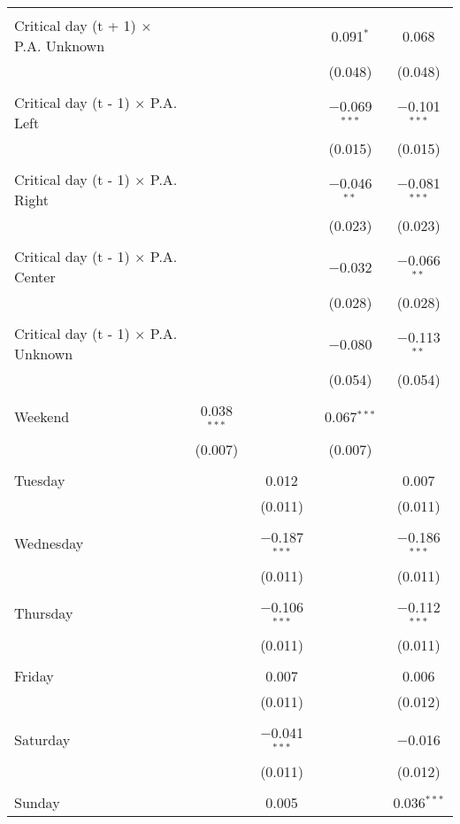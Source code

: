 \documentclass[
]{article}
\begin{document}
\begin{table}[!htbp]
{\begin{tabular}{@{\extracolsep{5pt}}lcccc}
  & & & & \\ 
 Critical day (t + 1) $\times$ P.A. Unknown &  &  & 0.091$^{*}$ & 0.068 \\ 
  &  &  & (0.048) & (0.048) \\ 
  & & & & \\ 
 Critical day (t - 1) $\times$ P.A. Left &  &  & $-$0.069$^{***}$ & $-$0.101$^{***}$ \\ 
  &  &  & (0.015) & (0.015) \\ 
  & & & & \\ 
 Critical day (t - 1) $\times$ P.A. Right &  &  & $-$0.046$^{**}$ & $-$0.081$^{***}$ \\ 
  &  &  & (0.023) & (0.023) \\ 
  & & & & \\ 
 Critical day (t - 1) $\times$ P.A. Center &  &  & $-$0.032 & $-$0.066$^{**}$ \\ 
  &  &  & (0.028) & (0.028) \\ 
  & & & & \\ 
 Critical day (t - 1) $\times$ P.A. Unknown &  &  & $-$0.080 & $-$0.113$^{**}$ \\ 
  &  &  & (0.054) & (0.054) \\ 
  & & & & \\ 
 Weekend & 0.038$^{***}$ &  & 0.067$^{***}$ &  \\ 
  & (0.007) &  & (0.007) &  \\ 
  & & & & \\ 
 Tuesday &  & 0.012 &  & 0.007 \\ 
  &  & (0.011) &  & (0.011) \\ 
  & & & & \\ 
 Wednesday &  & $-$0.187$^{***}$ &  & $-$0.186$^{***}$ \\ 
  &  & (0.011) &  & (0.011) \\ 
  & & & & \\ 
 Thursday &  & $-$0.106$^{***}$ &  & $-$0.112$^{***}$ \\ 
  &  & (0.011) &  & (0.011) \\ 
  & & & & \\ 
 Friday &  & 0.007 &  & 0.006 \\ 
  &  & (0.011) &  & (0.012) \\ 
  & & & & \\ 
 Saturday &  & $-$0.041$^{***}$ &  & $-$0.016 \\ 
  &  & (0.011) &  & (0.012) \\ 
  & & & & \\ 
 Sunday &  & 0.005 &  & 0.036$^{***}$ \\ 

\end{tabular}}
\end{table}
\end{document}
